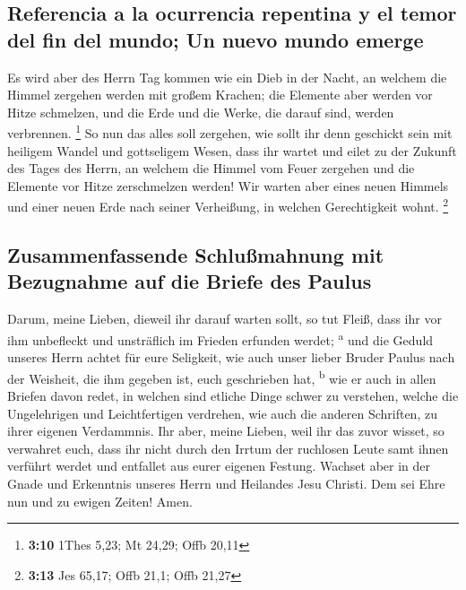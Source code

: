 \hypertarget{referencia-a-la-ocurrencia-repentina-y-el-temor-del-fin-del-mundo-un-nuevo-mundo-emerge}{%
\subsection{Referencia a la ocurrencia repentina y el temor del fin del
mundo; Un nuevo mundo
emerge}\label{referencia-a-la-ocurrencia-repentina-y-el-temor-del-fin-del-mundo-un-nuevo-mundo-emerge}}

 Es wird aber des Herrn Tag kommen wie ein Dieb in der
Nacht, an welchem die Himmel zergehen werden mit großem Krachen; die
Elemente aber werden vor Hitze schmelzen, und die Erde und die Werke,
die darauf sind, werden verbrennen. \footnote{\textbf{3:10} 1Thes 5,23;
  Mt 24,29; Offb 20,11}  So nun das alles soll zergehen,
wie sollt ihr denn geschickt sein mit heiligem Wandel und gottseligem
Wesen,  dass ihr wartet und eilet zu der Zukunft des
Tages des Herrn, an welchem die Himmel vom Feuer zergehen und die
Elemente vor Hitze zerschmelzen werden!  Wir warten aber
eines neuen Himmels und einer neuen Erde nach seiner Verheißung, in
welchen Gerechtigkeit wohnt. \footnote{\textbf{3:13} Jes 65,17; Offb
  21,1; Offb 21,27}

\hypertarget{zusammenfassende-schluuxdfmahnung-mit-bezugnahme-auf-die-briefe-des-paulus}{%
\subsection{Zusammenfassende Schlußmahnung mit Bezugnahme auf die Briefe
des
Paulus}\label{zusammenfassende-schluuxdfmahnung-mit-bezugnahme-auf-die-briefe-des-paulus}}

 Darum, meine Lieben, dieweil ihr darauf warten sollt, so
tut Fleiß, dass ihr vor ihm unbefleckt und unsträflich im Frieden
erfunden werdet; \textsuperscript{a}  und die Geduld
unseres Herrn achtet für eure Seligkeit, wie auch unser lieber Bruder
Paulus nach der Weisheit, die ihm gegeben ist, euch geschrieben hat,
\textsuperscript{b}  wie er auch in allen Briefen davon
redet, in welchen sind etliche Dinge schwer zu verstehen, welche die
Ungelehrigen und Leichtfertigen verdrehen, wie auch die anderen
Schriften, zu ihrer eigenen Verdammnis.  Ihr aber, meine
Lieben, weil ihr das zuvor wisset, so verwahret euch, dass ihr nicht
durch den Irrtum der ruchlosen Leute samt ihnen verführt werdet und
entfallet aus eurer eigenen Festung.  Wachset aber in der
Gnade und Erkenntnis unseres Herrn und Heilandes Jesu Christi. Dem sei
Ehre nun und zu ewigen Zeiten! Amen.
